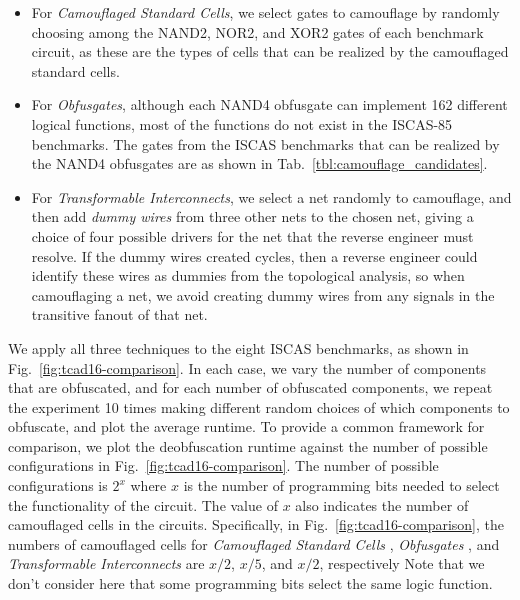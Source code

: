 \documentclass[proposal]{umassthesis}  %
\begin{document}
\begin{itemize}

\item For \textit{Camouflaged Standard Cells}, we select {gates to camouflage by randomly choosing among the } NAND2, NOR2, and XOR2 gates of each benchmark circuit, as these are the types of cells that can be realized by the camouflaged standard cells.

\item For \textit{Obfusgates}, although each NAND4 obfusgate can implement 162 different logical functions, most of the functions do not exist in the ISCAS-85 benchmarks. The gates from the ISCAS benchmarks that can be realized by the NAND4 obfusgates are as shown in Tab.~\ref{tbl:camouflage_candidates}.

\item For \textit{Transformable Interconnects}, we select a net randomly to camouflage, and then add \textit{dummy wires} from three other nets to the chosen net, giving a choice of four possible drivers for the net that the reverse engineer must resolve. If the dummy wires created cycles, then a reverse engineer could identify these wires as dummies from the topological analysis, so when camouflaging a net, we avoid creating dummy wires from any signals in the transitive fanout of that net. 

\end{itemize}



We apply all three techniques to the eight ISCAS benchmarks, as shown in Fig.~\ref{fig:tcad16-comparison}. In each case, we vary the number of components that are obfuscated, and for each number of obfuscated components, we repeat the experiment 10 times making different random choices of which components to obfuscate, and plot the average runtime. To provide a common framework for comparison, we plot the deobfuscation runtime against the number of possible configurations in Fig.~\ref{fig:tcad16-comparison}. The number of possible configurations is $2^x$ where $x$ is the number of programming bits needed to select the functionality of the circuit. {The value of $x$ also indicates the number of camouflaged cells in the circuits. Specifically, in Fig.~\ref{fig:tcad16-comparison}, the numbers of camouflaged cells for \textit{Camouflaged Standard Cells} \cite{rajendran-13}, \textit{Obfusgates} \cite{malik-obfusgate}, and \textit{Transformable Interconnects} \cite{chen-2015-dummyWire} are $x/2$, $x/5$, and $x/2$, respectively} Note that we don't consider here that some programming bits select the same logic function. 
\end{document}
